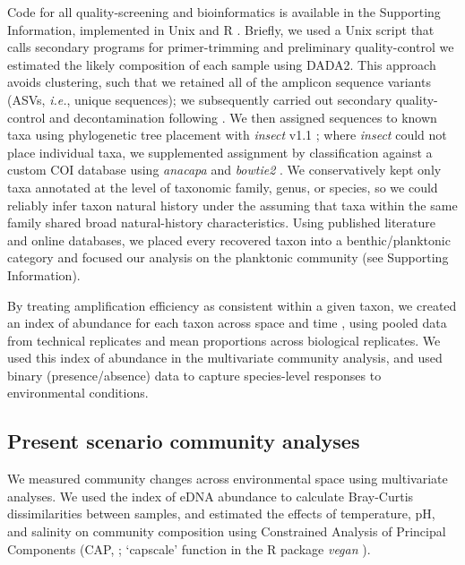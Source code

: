 \documentclass[11pt]{article}
\begin{document}
\begin{linenumbers}
Code for all quality-screening and bioinformatics is available in the Supporting Information, implemented in Unix and R \cite{r_core_development_team_r:_2013}. Briefly, we used a Unix script that calls secondary programs for primer-trimming and preliminary quality-control \cite{martin2011cutadapt, Callahan:2016aa} we estimated the likely composition of each sample using DADA2. This approach avoids clustering, such that we retained all of the amplicon sequence variants (ASVs, \textit{i.e.}, unique sequences); we subsequently carried out secondary quality-control and decontamination following \cite{kelly2018tides}. We then assigned sequences to known taxa using phylogenetic tree placement with \textit{insect} v1.1 \cite{insect}; where \textit{insect} could not place individual taxa, we supplemented assignment by classification against a custom COI database using \textit{anacapa} \cite{curd2019anacapa} and \textit{bowtie2} \cite{langmead2012fast}. We conservatively kept only taxa annotated at the level of taxonomic family, genus, or species, so we could reliably infer taxon natural history under the assuming that taxa within the same family shared broad natural-history characteristics. Using published literature and online databases, we placed every recovered taxon into a benthic/planktonic category and focused our analysis on the planktonic community (see Supporting Information).

By treating amplification efficiency as consistent within a given taxon, we created an index of abundance for each taxon across space and time \cite{kelly2019understanding}, using pooled data from technical replicates and mean proportions across biological replicates. We used this index of abundance in the multivariate community analysis, and used binary (presence/absence) data to capture species-level responses to environmental conditions.

\subsection*{Present scenario community analyses}

We measured community changes across environmental space using multivariate analyses. We used the index of eDNA abundance to calculate Bray-Curtis dissimilarities  between samples, and estimated the effects of temperature, pH, and salinity on community composition using Constrained Analysis of Principal Components (CAP, \cite{anderson2003canonical}; `capscale' function in the R package \textit{vegan} \cite{vegan}). 


\end{linenumbers}
\end{document}
